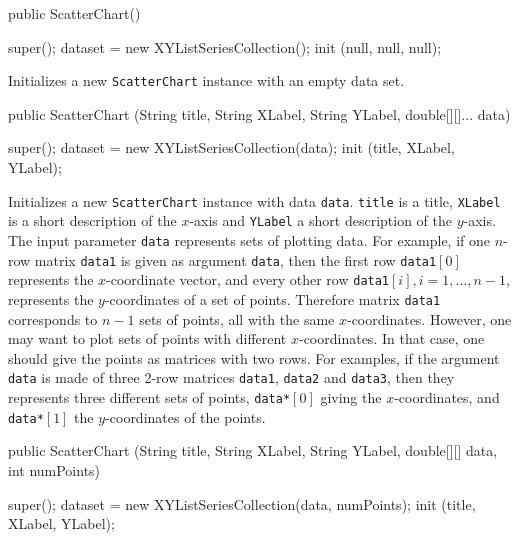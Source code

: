 \begin{code}

   public ScatterChart() \begin{hide} {
      super();
      dataset = new XYListSeriesCollection();
      init (null, null, null);
   }\end{hide}
\end{code}
\begin{tabb}
   Initializes a new \texttt{ScatterChart} instance with an empty data set.
\end{tabb}
\begin{code}

   public ScatterChart (String title, String XLabel, String YLabel,
                        double[][]... data) \begin{hide} {
      super();
      dataset = new XYListSeriesCollection(data);
      init (title, XLabel, YLabel);
   }\end{hide}
\end{code}
\begin{tabb}
Initializes a new \texttt{ScatterChart} instance with data \texttt{data}.
\texttt{title} is a title, \texttt{XLabel} is a short description of the
$x$-axis and \texttt{YLabel} a short description of the $y$-axis.
The input parameter \texttt{data}  represents sets of plotting data.
%
 For example, if one $n$-row matrix \texttt{data1} is given as argument
 \texttt{data}, then the first row \texttt{data1}$[0]$ represents the
 $x$-coordinate vector, and every other row \texttt{data1}$[i],
   i=1,\ldots, n-1$, represents the $y$-coordinates of a set of points.
  Therefore matrix \texttt{data1}  corresponds
   to $n-1$ sets of points, all with the same $x$-coordinates.
%
  However, one may want to plot sets of points with different $x$-coordinates.
  In that case, one should give the points as matrices with two rows.
For examples, if the argument \texttt{data} is made of three 2-row matrices
\texttt{data1}, \texttt{data2} and \texttt{data3}, then they represents
 three different sets of points, \texttt{data*}$[0]$ giving the $x$-coordinates,
 and  \texttt{data*}$[1]$  the $y$-coordinates of the points.
\end{tabb}
\begin{htmlonly}
\end{htmlonly}
\begin{code}

   public ScatterChart (String title, String XLabel, String YLabel,
                        double[][] data, int numPoints) \begin{hide} {
      super();
      dataset = new XYListSeriesCollection(data, numPoints);
      init (title, XLabel, YLabel);
   }\end{hide}
\end{code}
